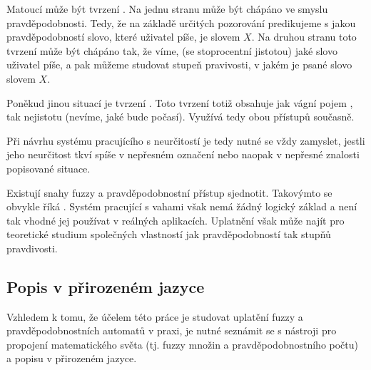\documentclass[a4paper,10pt]{article}
\begin{document}
Matoucí může být tvrzení . Na jednu stranu může být chápáno ve smyslu pravděpodobnosti. Tedy, že na základě určitých pozorování predikujeme s jakou pravděpodobností slovo, které uživatel píše, je slovem $X$. Na druhou stranu toto tvrzení může být chápáno tak, že víme, (se stoprocentní jistotou) jaké slovo uživatel píše, a pak můžeme studovat stupeň pravivosti, v jakém je psané slovo slovem $X$.

Poněkud jinou situací je tvrzení . Toto tvrzení totiž obsahuje jak vágní pojem , tak nejistotu (nevíme, jaké bude počasí). Využívá tedy obou přístupů současně.

Při návrhu systému pracujícího s neurčitostí je tedy nutné se vždy zamyslet, jestli jeho neurčitost tkví spíše v nepřesném označení nebo naopak v nepřesné znalosti popisované situace.

\begin{note}
 Existují snahy fuzzy a pravděpodobnostní přístup sjednotit. Takovýmto  se obvykle říká . Systém pracující s vahami však nemá žádný logický základ a není tak vhodné jej používat v reálných aplikacích. Uplatnění však může najít pro teoretické studium společných vlastností jak pravděpodobností tak stupňů pravdivosti.
\end{note}


% 
% 
% 

\subsection{Popis v přirozeném jazyce}
Vzhledem k tomu, že účelem této práce je studovat uplatění fuzzy a pravděpodobnostních automatů v praxi, je nutné seznámit se s nástroji pro propojení matematického světa (tj. fuzzy množin a pravděpodobnostního počtu) a popisu v přirozeném jazyce.
\end{document}

